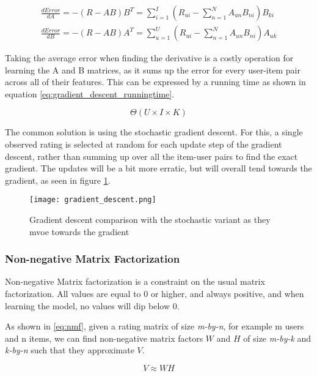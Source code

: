 \begin{equation}\label{eq:derivative_gradient}
	\begin{split}
	\frac{dError}{dA}=-(R-AB)B^T = \sum_{i=1}^{I}(R_{ui} - \sum_{n=1}^{N} A_{un}B_{ni})B_{ki}
	\\
	\frac{dError}{dB}=-(R-AB)A^T = \sum_{u=1}^{U}(R_{ui} - \sum_{n=1}^{N} A_{un}B_{ni})A_{uk}
	\end{split}
\end{equation}

Taking the average error when finding the derivative is a costly operation for learning the A and B matrices, as it sums up the error for every user-item pair across all of their features. This can be expressed by a running time as shown in equation \ref{eq:gradient_descent_runningtime}.

\begin{equation}\label{eq:gradient_descent_runningtime}
	\Theta(U\times I \times K)
\end{equation}

The common solution is using the stochastic gradient descent. For this, a single observed rating is selected at random for each update step of the gradient descent, rather than summing up over all the item-user pairs to find the exact gradient. The updates will be a bit more erratic, but will overall tend towards the gradient, as seen in figure \ref{fig:gradient_descent}.

\begin{figure}\label{fig:gradient_descent}
	\centering
	\texttt{[image: gradient\_descent.png]}
	\caption{Gradient descent comparison with the stochastic variant as they mvoe towards the gradient}
\end{figure}



\subsubsection{Non-negative Matrix Factorization}

Non-negative Matrix factorization is a constraint on the usual matrix factorization. All values are equal to 0 or higher, and always positive, and when learning the model, no values will dip below 0.

As shown in \ref{eq:nmf}, given a rating matrix of size \textit{m-by-n}, for example m users and n items, we can find non-negative matrix factors $W$ and $H$ of size \textit{m-by-k} and \textit{k-by-n} such that they approximate $V$.

\begin{equation} \label{eq:nmf}
	V \approx W H
\end{equation}

